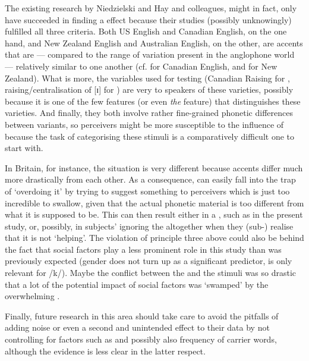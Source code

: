 The existing research by Niedzielski and Hay and colleagues, might in fact, only have succeeded in finding a  effect because their studies (possibly unknowingly) fulfilled all three criteria.
Both US English and Canadian English, on the one hand, and New Zealand English and Australian English, on the other, are accents that are --- compared to the range of variation present in the anglophone world --- relatively similar to one another (cf. \citealt[31]{halford2002} for Canadian English, and \citealt[354]{hayetal2006a}for New Zealand).
What is more, the variables used for testing (Canadian Raising for \citealt{niedzielski1999}, raising/centralisation of [ɪ] for \citealt{hayetal2006a,haydrager2010}) are very  to speakers of these varieties, possibly because it is one of the few features (or even \emph{the} feature) that distinguishes these varieties.
And finally, they both involve rather fine-grained phonetic differences between variants, so perceivers might be more susceptible to the influence of  because the task of categorising these stimuli is a comparatively difficult one to start with.

In Britain, for instance, the situation is very different because accents differ much more drastically from each other.
As a consequence,  can easily fall into the trap of `overdoing it' by trying to suggest something to perceivers which is just too incredible to swallow, given that the actual phonetic material is too different from what it is supposed to be.
This can then result either in a , such as in the present study, or, possibly, in subjects' ignoring the  altogether \parencite[like in][]{lawrence2015} when they (sub-) realise that it is not `helping'.
The violation of principle three above could also be behind the fact that social factors play a less prominent role in this study than was previously expected (gender does not turn up as a significant predictor,  is only relevant for /k/).
Maybe the conflict between the  and the stimuli was so drastic that a lot of the potential impact of social factors was `swamped' by the overwhelming .

Finally, future research in this area should take care to avoid the pitfalls of adding noise or even a second and unintended  effect to their data by not controlling for factors such as  and possibly also frequency of carrier words, although the evidence is less clear in the latter respect.

